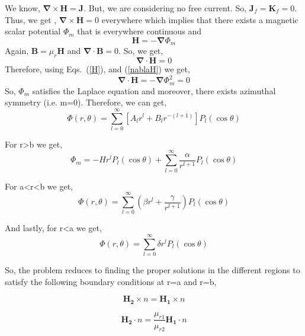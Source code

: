 We know, \(\bm{\nabla}\times\bm{H}=\bm{J}\). But, we are considering no free current. So, \(\bm{J}_f=\bm{K}_f=0\). Thus, we get , \(\bm{\nabla}\times\bm{H}=0\) everywhere which implies that there exists a magnetic scalar potential \(\Phi_m\) that is everywhere continuous and
\begin{equation}\label{H}
\bm{H}=-\bm{\nabla}\Phi_m
\end{equation} 
Again, \(\bm{B}=\mu_r\bm{H}\) and \(\bm{\nabla}\cdot\bm{B}=0\). So, we get,
\begin{equation}\label{nablaH}
\bm{\nabla}\cdot\bm{H}=0
\end{equation}
Therefore, using Eqs.~(\ref{H}), and (\ref{nablaH}) we get,
\begin{equation}
\bm{\nabla}\cdot\bm{H}=-\bm{\nabla}\Phi_m^2=0
\end{equation}
So, $\Phi_m$ satisfies the Laplace equation and moreover, there exists azimuthal symmetry (i.e. m=0). Therefore, we can get,
\begin{equation}
\Phi(r,\theta)=\sum_{l=0}^{\infty} [A_lr^l+B_lr^{-(l+1)}]P_l(\cos\theta)
\end{equation}

For r\textgreater b we get,
\begin{equation}\label{r>b}
\Phi_m=-Hr^lP_l(\cos\theta)+\sum_{l=0}^{\infty}\frac{\alpha}{r^{l+1}}P_l(\cos\theta)
\end{equation}

For a\textless r\textless b we get,
\begin{equation}\label{a<r<b}
\Phi(r,\theta)=\sum_{l=0}^{\infty} \left(\beta r^l+\frac{\gamma}{r^{l+1}}\right)P_l(\cos\theta)
\end{equation}

And lastly, for r\textless a we get,
\begin{equation}\label{r<a}
\Phi(r,\theta)=\sum_{l=0}^{\infty} \delta r^l P_l(\cos\theta)
\end{equation}

So, the problem reduces to finding the proper solutions in the different regions to satisfy the following boundary conditions at r=a and r=b,


\begin{equation}\label{b1}   
\bm{H_2}\times n = \bm{H_1}\times n  
\end{equation}

\begin{equation}\label{b2}   
\bm{H_2}\cdot n=\frac{\mu_{r1}}{\mu_{r2}}\bm{H_1}\cdot n
\end{equation}

